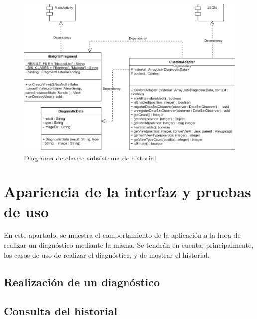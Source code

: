       \begin{figure}[H]
 	\centering
 	\includegraphics[scale = 0.75]{imagenes/androidAPP-Historial.png}
 	\caption{Diagrama de clases: subsistema de historial}
 	\label{fig:claseshist}
 \end{figure}
 
 \section{Apariencia de la interfaz y pruebas de uso}
 
 En este apartado, se muestra el comportamiento de la aplicación a la hora de realizar un diagnóstico mediante la misma. Se tendrán en cuenta, principalmente, los casos de uso de realizar el diagnóstico, y de mostrar el historial.
 
 \subsection{Realización de un diagnóstico}
 \subsection{Consulta del historial}